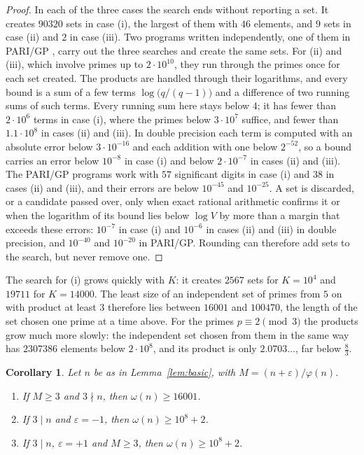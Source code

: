 \documentclass[screen,reqno]{aomart}
\numberwithin{equation}{section}
\theoremstyle{plain}
\newtheorem{corollary}[theorem]{Corollary}
\theoremstyle{definition}
\theoremstyle{remark}
\begin{document}
\begin{proof}
In each of the three cases the search ends without reporting a set. It
creates $90320$ sets in case (i), the largest of them with $46$
elements, and $9$ sets in case (ii) and $2$ in case (iii). Two programs
written independently, one of them in PARI/GP \cite{PARI}, carry out
the three searches and create the same sets. For (ii) and (iii), which
involve primes up to $2\cdot10^{10}$, they run through the primes once
for each set created. The products are handled through their
logarithms, and every bound is a sum of a few terms
$\log\bigl(q/(q-1)\bigr)$ and a difference of two running sums of
such terms. Every running sum here stays below $4$; it has fewer than
$2\cdot10^6$ terms in case (i), where the primes below $3\cdot10^7$
suffice, and fewer than $1.1\cdot10^8$ in cases (ii) and (iii). In
double precision each term is computed with an absolute error below
$3\cdot10^{-16}$ and each addition with one below $2^{-52}$, so a
bound carries an error below $10^{-8}$ in case (i) and below
$2\cdot10^{-7}$ in cases (ii) and (iii). The PARI/GP programs work
with $57$ significant digits in case (i) and $38$ in cases (ii) and
(iii), and their errors are below $10^{-45}$ and $10^{-25}$. A set is
discarded, or a candidate passed over, only when exact rational
arithmetic confirms it or when the logarithm of its bound lies below
$\log V$ by more than a margin that exceeds these errors: $10^{-7}$
in case (i) and $10^{-6}$ in cases (ii) and (iii) in double
precision, and $10^{-40}$ and $10^{-20}$ in PARI/GP. Rounding can
therefore add sets to the search, but never remove one.
\end{proof}

The search for (i) grows quickly with $K$: it creates $2567$ sets for
$K=10^4$ and $19711$ for $K=14000$. The least size of an independent
set of primes from $5$ on with product at least $3$ therefore lies
between $16001$ and $100470$, the length of the set chosen one prime
at a time above. For the primes $p\equiv2\pmod3$ the products grow
much more slowly: the independent set chosen from them in the same way
has $2307386$ elements below $2\cdot10^8$, and its product is only
$2.0703\ldots$, far below $\frac83$.

\begin{corollary}\label{cor:indep}
Let $n$ be as in Lemma~\ref{lem:basic}, with $M=(n+\varepsilon)/\varphi(n)$.
\begin{enumerate}[label=\textup{(\roman*)}]
\item If $M\ge3$ and $3\nmid n$, then $\omega(n)\ge16001$.
\item If $3\mid n$ and $\varepsilon=-1$, then $\omega(n)\ge10^8+2$.
\item If $3\mid n$, $\varepsilon=+1$ and $M\ge3$, then
  $\omega(n)\ge10^8+2$.
\end{enumerate}
\end{corollary}
\end{document}
